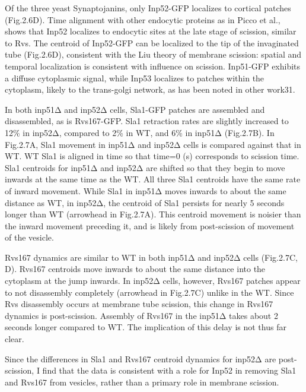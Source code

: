 Of the three yeast Synaptojanins, only Inp52-GFP localizes to cortical patches (Fig.2.6D). Time alignment with other endocytic proteins as in Picco et al., shows that Inp52 localizes to endocytic sites at the late stage of scission, similar to Rvs. The centroid of Inp52-GFP can be localized to the tip of the invaginated tube (Fig.2.6D), consistent with the Liu theory of membrane scission: spatial and temporal localization is consistent with influence on scission. Inp51-GFP exhibits a diffuse cytoplasmic signal, while Inp53 localizes to patches within the cytoplasm, likely to the trans-golgi network, as has been noted in other work31. 
	\vspace{5mm}
	
In both inp51Δ and inp52Δ cells, Sla1-GFP patches are assembled and disassembled, as is Rvs167-GFP. Sla1 retraction rates are slightly increased to 12\% in inp52Δ, compared to 2\% in WT, and 6\% in inp51Δ (Fig.2.7B). In Fig.2.7A, Sla1 movement in inp51Δ and inp52Δ cells is compared against that in WT. WT Sla1 is aligned in time so that time=0 (s) corresponds to scission time. Sla1 centroids for inp51Δ and inp52Δ are shifted so that they begin to move inwards at the same time as the WT. All three Sla1 centroids have the same rate of inward movement. While Sla1 in inp51Δ moves inwards to about the same distance as WT, in inp52Δ, the centroid of Sla1 persists for nearly 5 seconds longer than WT (arrowhead in Fig.2.7A). This centroid movement is noisier than the inward movement preceding it, and is likely from post-scission of movement of the vesicle. 
	\vspace{5mm}
	
Rvs167 dynamics are similar to WT in both inp51Δ and inp52Δ cells (Fig.2.7C, D). Rvs167 centroids move inwards to about the same distance into the cytoplasm at the jump inwards. In inp52Δ cells, however, Rvs167 patches appear to not disassembly completely (arrowhead in Fig.2.7C) unlike in the WT. Since Rvs disassembly occurs at membrane tube scission, this change in Rvs167 dynamics is post-scission. Assembly of Rvs167 in the inp51Δ takes about 2 seconds longer compared to WT. The implication of this delay is not thus far clear. 
	\vspace{5mm}

Since the differences in Sla1 and Rvs167 centroid dynamics for inp52Δ are post-scission, I find that the data is consistent with a role for Inp52 in removing Sla1 and Rvs167 from vesicles, rather than a primary role in membrane scission. 




